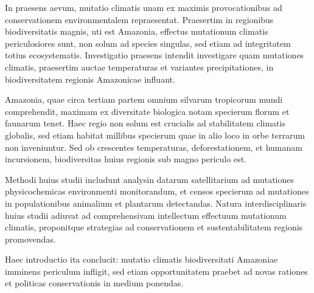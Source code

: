 In praesens aevum, mutatio climatis unam ex maximis provocationibus ad conservationem environmentalem repraesentat. Praesertim in regionibus biodiversitatis magnis, uti est Amazonia, effectus mutationum climatis periculosiores sunt, non solum ad species singulas, sed etiam ad integritatem totius ecosystematis. Investigatio praesens intendit investigare quam mutationes climatis, praesertim auctae temperaturas et variantes precipitationes, in biodiversitatem regionis Amazonicae influant.

Amazonia, quae circa tertiam partem omnium silvarum tropicorum mundi comprehendit, maximam ex diversitate biologica notam specierum florum et faunarum tenet. Haec regio non solum est crucialis ad stabilitatem climatis globalis, sed etiam habitat millibus specierum quae in alio loco in orbe terrarum non inveniuntur. Sed ob crescentes temperaturas, deforestationem, et humanam incursionem, biodiversitas huius regionis sub magno periculo est.

Methodi huius studii includunt analysin datarum satellitarium ad mutationes physicochemicas environmenti monitorandum, et censos specierum ad mutationes in populationibus animalium et plantarum detectandas. Natura interdisciplinaris huius studii adiuvat ad comprehensivam intellectum effectuum mutationum climatis, proponitque strategias ad conservationem et sustentabilitatem regionis promovendas.

Haec introductio ita conclucit: mutatio climatis biodiversitati Amazoniae imminens periculum infligit, sed etiam opportunitatem praebet ad novas rationes et politicas conservationis in medium ponendas.